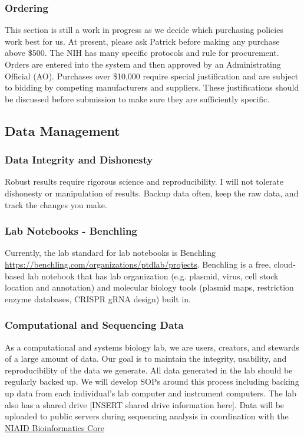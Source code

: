 \documentclass[10pt, letterpaper, twocolumn]{article} %
\begin{document}
\subsubsection{Ordering}
 This section is still a work in progress as we decide which purchasing policies work best for us. At present, please ask Patrick before making any purchase above \$500. The NIH has many specific protocols and rule for procurement. Orders are entered into the system and then approved by an Administrating Official (AO). Purchases over \$10,000 require special justification and are subject to bidding by competing manufacturers and suppliers. These justifications should be discussed before submission to make sure they are sufficiently specific.

\subsection{Data Management}
\subsubsection{Data Integrity and Dishonesty}
Robust results require rigorous science and reproducibility. I will not tolerate dishonesty or manipulation of results. Backup data often, keep the raw data, and track the changes you make.

\subsubsection{Lab Notebooks - Benchling}
Currently, the lab standard for lab notebooks is Benchling \href{https://benchling.com/organizations/ptdlab/projects}{https://benchling.com/organizations/ptdlab/projects}. Benchling is a free, cloud-based lab notebook that has lab organization (e.g. plasmid, virus, cell stock location and annotation) and molecular biology tools (plasmid maps, restriction enzyme databases, CRISPR gRNA design) built in.

\subsubsection{Computational and Sequencing Data}
As a computational and systems biology lab, we are users, creators, and stewards of a large amount of data. Our goal is to maintain the integrity, usability, and reproducibility of the data we generate. All data generated in the lab should be regularly backed up. We will develop SOPs around this process including backing up data from each individual's lab computer and instrument computers. The lab also has a shared drive [INSERT shared drive information here]. Data will be uploaded to public servers during sequencing analysis in coordination with the \href{https://bioinformatics.niaid.nih.gov/}{NIAID Bioinformatics Core}
\end{document}
